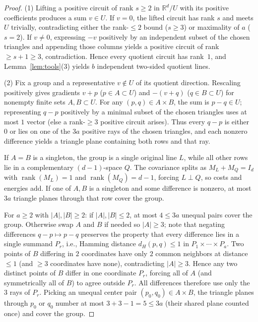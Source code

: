 \documentclass[11pt]{article}
\theoremstyle{plain}
\theoremstyle{definition}
\theoremstyle{remark}
\DeclareMathOperator{\rank}{rank}
\begin{document}
\begin{proof}
(1) Lifting a positive circuit of rank $s \ge 2$ in $\mathbb{R}^d / U$ with its positive coefficients produces a sum $v \in U$.
If $v = 0$, the lifted circuit has rank $s$ and meets $U$ trivially, contradicting either the rank-$\le 2$ bound ($s \ge 3$) or maximality of $a$ ($s = 2$).
If $v \neq 0$, expressing $-v$ positively by an independent subset of the chosen triangles and appending those columns yields a positive circuit of rank $\ge s + 1 \ge 3$, contradiction.
Hence every quotient circuit has rank~$1$, and Lemma~\ref{lem:tools}(3) yields $b$ independent two-sided quotient lines.

(2) Fix a group and a representative $v \notin U$ of its quotient direction.
Rescaling positively gives gradients $v + p$ ($p \in A \subset U$) and $-(v + q)$ ($q \in B \subset U$) for nonempty finite sets $A, B \subset U$.
For any $(p, q) \in A \times B$, the sum is $p - q \in U$; representing $q - p$ positively by a minimal subset of the chosen triangles uses at most $1$ vector (else a rank-$\ge 3$ positive circuit arises).
Thus every $q - p$ is either $0$ or lies on one of the $3a$ positive rays of the chosen triangles, and each nonzero difference yields a triangle plane containing both rows and that ray.

If $A = B$ is a singleton, the group is a single original line $L$, while all other rows lie in a complementary $(d - 1)$-space $Q$.
The covariance splits as $M_L + M_Q = I_d$ with $\rank(M_L) = 1$ and $\rank(M_Q) = d - 1$, forcing $L \perp Q$, so costs and energies add.
If one of $A, B$ is a singleton and some difference is nonzero, at most $3a$ triangle planes through that row cover the group.

For $a \ge 2$ with $|A|, |B| \ge 2$: if $|A|, |B| \le 2$, at most $4 \le 3a$ unequal pairs cover the group.
Otherwise swap $A$ and $B$ if needed so $|A| \ge 3$; note that negating differences $q - p \mapsto p - q$ preserves the property that every difference lies in a single summand $P_r$, i.e., Hamming distance $d_H(p, q) \le 1$ in $P_1 \times \cdots \times P_a$.
Two points of $B$ differing in $2$ coordinates have only $2$ common neighbors at distance $\le 1$ (and $\ge 3$ coordinates have none), contradicting $|A| \ge 3$.
Hence any two distinct points of $B$ differ in one coordinate $P_r$, forcing all of $A$ (and symmetrically all of $B$) to agree outside $P_r$.
All differences therefore use only the $3$ rays of $P_r$.
Picking an unequal center pair $(p_0, q_0) \in A \times B$, the triangle planes through $p_0$ or $q_0$ number at most $3 + 3 - 1 = 5 \le 3a$ (their shared plane counted once) and cover the group.


\end{proof}
\end{document}
